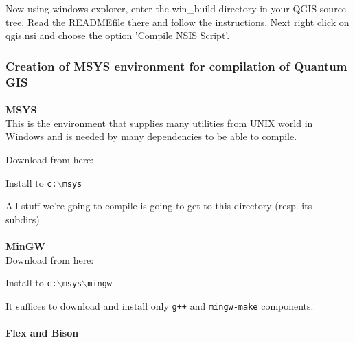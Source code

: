 Now using windows explorer, enter the win\_build directory in your QGIS source
tree. Read the READMEfile there and follow the instructions. Next right click
on qgis.nsi and choose the option 'Compile NSIS Script'. 

\hypertarget{toc17}{}
\subsubsection{Creation of MSYS environment for compilation of Quantum GIS}
\paragraph{}\textbf{MSYS}\\

This is the environment that supplies many utilities from UNIX world in Windows and is needed
by many dependencies to be able to compile.

Download from here:

	\begin{quotation}
	\end{quotation}

Install to \texttt{c:$\backslash$msys}

All stuff we're going to compile is going to get to this directory (resp. its subdirs).

\paragraph{}\textbf{MinGW}\\

Download from here:

	\begin{quotation}
	\end{quotation}

Install to \texttt{c:$\backslash$msys$\backslash$mingw}

It suffices to download and install only \texttt{g++} and \texttt{mingw-make} components.

\paragraph{}\textbf{Flex and Bison}\\

